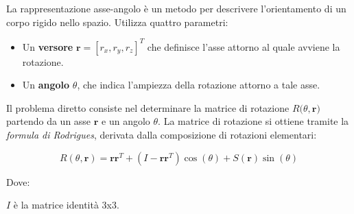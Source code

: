 \documentclass[11pt, a4paper]{article}
\begin{document}

\begin{par}
\begin{flushleft}
La rappresentazione asse-angolo è un metodo per descrivere l'orientamento di un corpo rigido nello spazio. Utilizza quattro parametri:
\end{flushleft}
\end{par}

\begin{itemize}
\setlength{\itemsep}{-1ex}
   \item{\begin{flushleft} Un \textbf{versore} $\mathbf{r}=[r_x ,r_y ,r_z ]^T$ che definisce l'asse attorno al quale avviene la rotazione. \end{flushleft}}
   \item{\begin{flushleft} Un \textbf{angolo} $\theta$, che indica l'ampiezza della rotazione attorno a tale asse. \end{flushleft}}
\end{itemize}


\begin{par}
\begin{flushleft}
Il problema diretto consiste nel determinare la matrice di rotazione $R\bigl(\theta ,\mathbf{r}\bigr)$ partendo da un asse $\mathbf{r}$ e un angolo $\theta$. La matrice di rotazione si ottiene tramite la \textit{formula di Rodrigues}, derivata dalla composizione di rotazioni elementari:
\end{flushleft}
\end{par}

\begin{par}
$$R(\theta ,\mathbf{r})=\mathbf{r}\mathbf{r}^T +(I-\mathbf{r}\mathbf{r}^T )\cos (\theta )+S(\mathbf{r})\sin (\theta )$$
\end{par}

\begin{par}
\begin{flushleft}
Dove:
\end{flushleft}
\end{par}

\begin{par}
\begin{flushleft}
$I$ è la matrice identità 3x3.
\end{flushleft}
\end{par}
\end{document}
